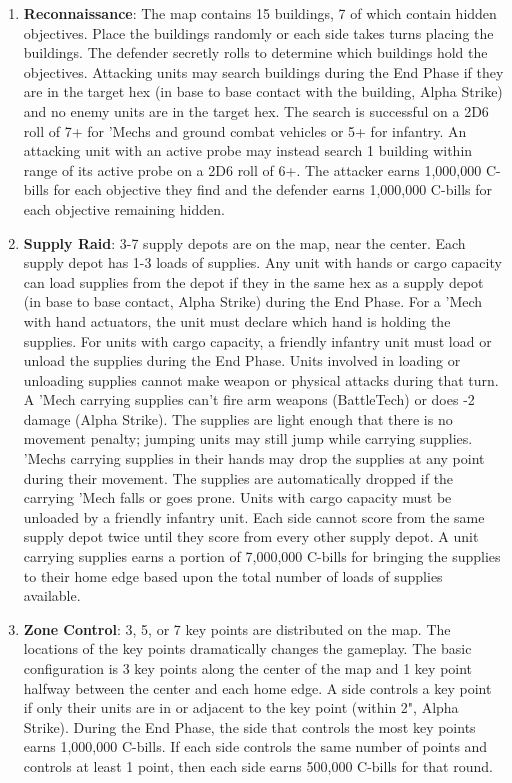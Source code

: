 \begin{enumerate}

\item {\bfseries Reconnaissance}: The map contains 15 buildings, 7 of which contain hidden objectives.
Place the buildings randomly or each side takes turns placing the buildings.
The defender secretly rolls to determine which buildings hold the objectives.
Attacking units may search buildings during the End Phase if they are in the target hex (in base to base contact with the building, Alpha Strike) and no enemy units are in the target hex.
The search is successful on a 2D6 roll of 7+ for 'Mechs and ground combat vehicles or 5+ for infantry.
An attacking unit with an active probe may instead search 1 building within range of its active probe on a 2D6 roll of 6+.
The attacker earns 1,000,000 C-bills for each objective they find and the defender earns 1,000,000 C-bills for each objective remaining hidden.

\item {\bfseries Supply Raid}: 3-7 supply depots are on the map, near the center.
Each supply depot has 1-3 loads of supplies.
Any unit with hands or cargo capacity can load supplies from the depot if they in the same hex as a supply depot (in base to base contact, Alpha Strike) during the End Phase.
For a 'Mech with hand actuators, the unit must declare which hand is holding the supplies.
For units with cargo capacity, a friendly infantry unit must load or unload the supplies during the End Phase.
Units involved in loading or unloading supplies cannot make weapon or physical attacks during that turn.
A 'Mech carrying supplies can't fire arm weapons (BattleTech) or does -2 damage (Alpha Strike).
The supplies are light enough that there is no movement penalty; jumping units may still jump while carrying supplies.
'Mechs carrying supplies in their hands may drop the supplies at any point during their movement.
The supplies are automatically dropped if the carrying 'Mech falls or goes prone.
Units with cargo capacity must be unloaded by a friendly infantry unit.
Each side cannot score from the same supply depot twice until they score from every other supply depot.
A unit carrying supplies earns a portion of 7,000,000 C-bills for bringing the supplies to their home edge based upon the total number of loads of supplies available.

\item {\bfseries Zone Control}: 3, 5, or 7 key points are distributed on the map.
The locations of the key points dramatically changes the gameplay.
The basic configuration is 3 key points along the center of the map and 1 key point halfway between the center and each home edge.
A side controls a key point if only their units are in or adjacent to the key point (within 2", Alpha Strike).
During the End Phase, the side that controls the most key points earns 1,000,000 C-bills.
If each side controls the same number of points and controls at least 1 point, then each side earns 500,000 C-bills for that round.


\end{enumerate}
